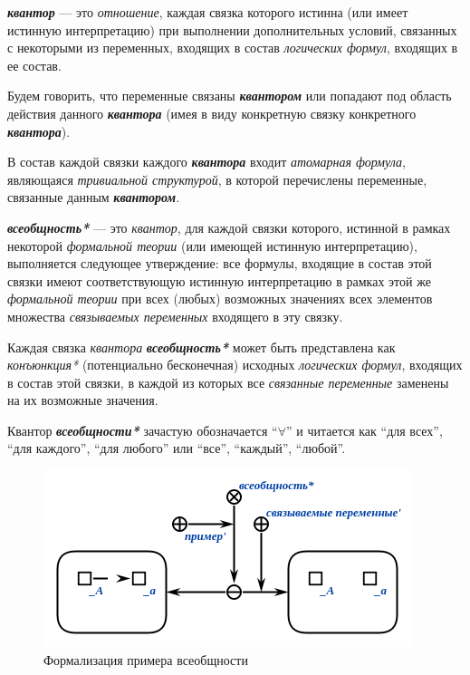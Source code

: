 \begin{SCn}
\end{SCn}

\textbf{\textit{квантор}} — это \textit{отношение}, каждая связка которого истинна (или имеет истинную интерпретацию) при выполнении дополнительных условий, связанных с некоторыми из переменных, входящих в состав \textit{логических формул}, входящих в ее состав.

Будем говорить, что переменные связаны \textbf{\textit{квантором}} или попадают под область действия данного \textbf{\textit{квантора}} (имея в виду конкретную связку конкретного \textbf{\textit{квантора}}).

В состав каждой связки каждого \textbf{\textit{квантора}} входит \textit{атомарная формула}, являющаяся \textit{тривиальной структурой}, в которой перечислены переменные, связанные данным \textbf{\textit{квантором}}.

\begin{SCn}
\end{SCn}

\textbf{\textit{всеобщность*}} --- это \textit{квантор}, для каждой связки которого, истинной в рамках некоторой \textit{формальной теории} (или имеющей истинную интерпретацию), выполняется следующее утверждение: все формулы, входящие в состав этой связки имеют соответствующую истинную интерпретацию в рамках этой же \textit{формальной теории} при всех (любых) возможных значениях всех элементов множества \textit{связываемых переменных\scnrolesign} входящего в эту связку.

Каждая связка \textit{квантора} \textbf{\textit{всеобщность*}} может быть представлена как \textit{конъюнкция*} (потенциально бесконечная) исходных \textit{логических формул}, входящих в состав этой связки, в каждой из которых все \textit{связанные переменные\scnrolesign} заменены на их возможные значения.

Квантор \textbf{\textit{всеобщности*}} зачастую обозначается ``$\forall$'' и читается как ``для всех'', ``для каждого'', ``для любого'' или ``все'', ``каждый'', ``любой''.

\begin{figure}[H]
\includegraphics[scale=0.8]{author/part2/figures/logic/universality.png}
\caption{Формализация примера всеобщности}
\label{fig:universality}
\end{figure}

